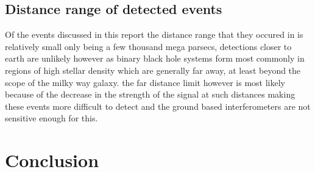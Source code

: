 \documentclass[]{article}
\begin{document}
\subsection*{Distance range of detected events}
Of the events discussed in this report the distance range that they occured in is relatively small only being a few thousand mega parsecs, detections closer to earth are unlikely however
as binary black hole systems form most commonly in regions of high stellar density which are generally far away, at least beyond the scope of the milky way galaxy.
the far distance limit however is most likely because of the decrease in the strength of the signal at such distances making these events more difficult to detect and the ground based interferometers
are not sensitive enough for this.

\section*{Conclusion}

% 
\cite{Galileo}
\end{document}

